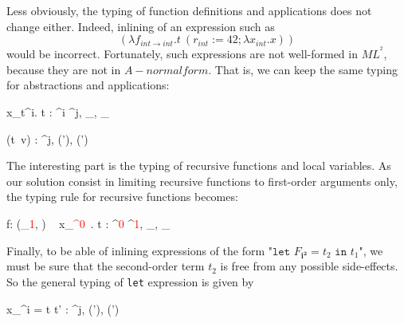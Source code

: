 \documentclass[a4paper,11pt,oneside]{article}
\theoremstyle{plain}
\newcommand{\bwedge}{\boldsymbol{~\wedge~}}
\newcommand{\bvee}{\boldsymbol{~\vee~}}
\newcommand{\inlsrc}{\textit{ML}^{^2}}
\begin{document}
	Less obviously, the typing of function definitions and applications
does not change either.  
	Indeed, inlining of an expression such as
$$ (\lambda f_{int \rightarrow int}.t~ (r_{int}:=42; \lambda x_{int}. x))$$
would be incorrect. 
	Fortunately, such expressions are not well-formed in $\inlsrc$, because they are not in $A-normal form$. That is, we can keep the same typing for
abstractions and applications: 

	\begin{footnotesize}
		\begin{multicols}{2}	
		{\vdash \lambda x_{t^i}. t : 
			\tau^{i} \stackrel{\theta, \rho}{\rightarrow} \tau^{j}, 
			\bot_{\theta},
 			\bot_{\rho}}

    {\vdash (t~v) : \tau^{j}, (\theta \bvee \theta'), (\rho \bvee \rho')}
		\end{multicols}
	\end{footnotesize}

The interesting part is the typing of recursive functions and local
variables.  As our solution consist in limiting recursive functions to first-order arguments only, the typing rule for recursive functions becomes:
	\begin{footnotesize}
		\infrule[T$_{ML^{^2}}$-Rec] 
		{\vdash t : \tau^{\textcolor{red}{1}}, \theta, \rho} 
		{\vdash \mu f: (\tau\textcolor{red}{_1}, \theta) ~ \lambda x_{\tau\textcolor{red}{^0}}~. t : 
			\tau^{\textcolor{red}{0}} \stackrel{\theta, \top_{\rho}}{\Rightarrow}\tau^{\textcolor{red}{1}}, 
			\bot_{\theta}, 
			\bot_{\rho}}
	\end{footnotesize}
Finally, to be able of inlining expressions of the form 
"$\texttt{let } F_{\boldsymbol{i^{2}}} = t_2 \texttt{ in } t_1 $",
we must be sure that the second-order term $t_2$ is free from any possible side-effects.
So the general typing of \texttt{let} expression is given by
	\begin{footnotesize}
		\infrule[T$_{ML^{^2}}$-Let] 
			{\vdash t : \tau^i, \theta, \rho 
			\qquad \vdash t' : \tau^j, \theta', \rho' 
			\qquad \textcolor{red}{(i = 2) \Rightarrow 
			\boldsymbol{(\theta = \bot_{\theta}\bwedge \rho = \bot_{\rho})}}} 
			{\vdash {} x_{\tau^i} = t \text{ in } t' 
				: \tau^{j}, 
				(\theta \bvee \theta'), 
				(\rho \bvee \rho')}
	\end{footnotesize}
\end{document}
